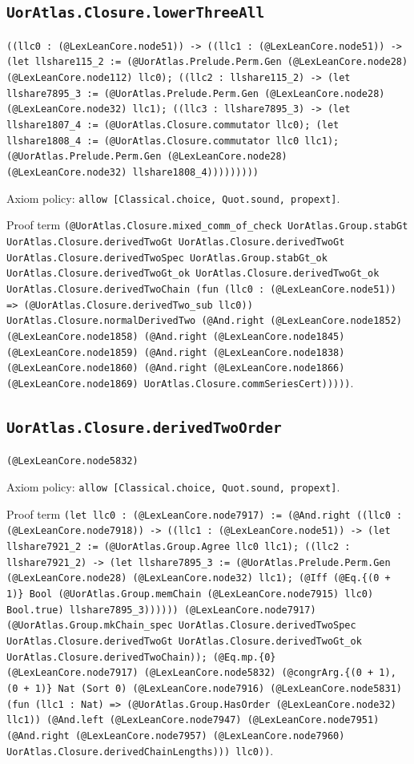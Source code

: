\documentclass[11pt]{article}
\begin{document}
\subsection*{\texttt{UorAtlas.Closure.lowerThreeAll}}
\noindent\texttt{((llc0 : (@LexLeanCore.node51)) -> ((llc1 : (@LexLeanCore.node51)) -> (let llshare115\_2 := (@UorAtlas.Prelude.Perm.Gen (@LexLeanCore.node28) (@LexLeanCore.node112) llc0); ((llc2 : llshare115\_2) -> (let llshare7895\_3 := (@UorAtlas.Prelude.Perm.Gen (@LexLeanCore.node28) (@LexLeanCore.node32) llc1); ((llc3 : llshare7895\_3) -> (let llshare1807\_4 := (@UorAtlas.Closure.commutator llc0); (let llshare1808\_4 := (@UorAtlas.Closure.commutator llc0 llc1); (@UorAtlas.Prelude.Perm.Gen (@LexLeanCore.node28) (@LexLeanCore.node32) llshare1808\_4)))))))))}\par
\noindent Axiom policy: \texttt{allow [Classical.choice, Quot.sound, propext]}.\par
\noindent Proof term \texttt{(@UorAtlas.Closure.mixed\_comm\_of\_check UorAtlas.Group.stabGt UorAtlas.Closure.derivedTwoGt UorAtlas.Closure.derivedTwoGt UorAtlas.Closure.derivedTwoSpec UorAtlas.Group.stabGt\_ok UorAtlas.Closure.derivedTwoGt\_ok UorAtlas.Closure.derivedTwoGt\_ok UorAtlas.Closure.derivedTwoChain (fun (llc0 : (@LexLeanCore.node51)) => (@UorAtlas.Closure.derivedTwo\_sub llc0)) UorAtlas.Closure.normalDerivedTwo (@And.right (@LexLeanCore.node1852) (@LexLeanCore.node1858) (@And.right (@LexLeanCore.node1845) (@LexLeanCore.node1859) (@And.right (@LexLeanCore.node1838) (@LexLeanCore.node1860) (@And.right (@LexLeanCore.node1866) (@LexLeanCore.node1869) UorAtlas.Closure.commSeriesCert)))))}.\par
\subsection*{\texttt{UorAtlas.Closure.derivedTwoOrder}}
\noindent\texttt{(@LexLeanCore.node5832)}\par
\noindent Axiom policy: \texttt{allow [Classical.choice, Quot.sound, propext]}.\par
\noindent Proof term \texttt{(let llc0 : (@LexLeanCore.node7917) := (@And.right ((llc0 : (@LexLeanCore.node7918)) -> ((llc1 : (@LexLeanCore.node51)) -> (let llshare7921\_2 := (@UorAtlas.Group.Agree llc0 llc1); ((llc2 : llshare7921\_2) -> (let llshare7895\_3 := (@UorAtlas.Prelude.Perm.Gen (@LexLeanCore.node28) (@LexLeanCore.node32) llc1); (@Iff (@Eq.\{(0 + 1)\} Bool (@UorAtlas.Group.memChain (@LexLeanCore.node7915) llc0) Bool.true) llshare7895\_3)))))) (@LexLeanCore.node7917) (@UorAtlas.Group.mkChain\_spec UorAtlas.Closure.derivedTwoSpec UorAtlas.Closure.derivedTwoGt UorAtlas.Closure.derivedTwoGt\_ok UorAtlas.Closure.derivedTwoChain)); (@Eq.mp.\{0\} (@LexLeanCore.node7917) (@LexLeanCore.node5832) (@congrArg.\{(0 + 1), (0 + 1)\} Nat (Sort 0) (@LexLeanCore.node7916) (@LexLeanCore.node5831) (fun (llc1 : Nat) => (@UorAtlas.Group.HasOrder (@LexLeanCore.node32) llc1)) (@And.left (@LexLeanCore.node7947) (@LexLeanCore.node7951) (@And.right (@LexLeanCore.node7957) (@LexLeanCore.node7960) UorAtlas.Closure.derivedChainLengths))) llc0))}.\par
\end{document}
